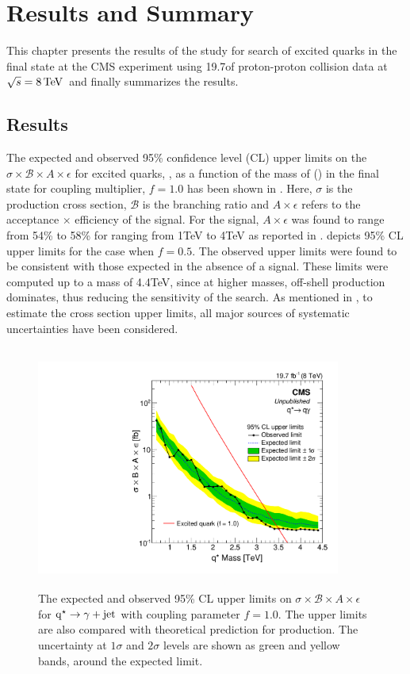 \chapter{Results and Summary}

This chapter presents the results of the study for search of excited quarks in the \gamjet final state at the CMS experiment using 19.7\fbinv of 
proton-proton collision data at $ \sqrt{s}= 8\mathrm{\,TeV} \,$ and finally summarizes the results.

\section{Results}
The expected and observed 95\% confidence level (CL) upper limits on the $\sigma\times\mathcal{B}\times{A}\times\epsilon$ for excited quarks, 
\qstar, as a function of the mass of \qstar (\mqstar) in the \gamjet final state for coupling multiplier, $f = 1.0$ has been shown in 
\fig{\ref{fig:qstarLimitfull}}. Here, $\sigma$ is the production cross section, $\mathcal{B}$ is the branching ratio and $A\times\epsilon$ refers 
to the acceptance $\times$ efficiency of the \qstar signal. For the \qstar signal, $A\times\epsilon$ was found to range from 54\% to 58\% for 
\mqstar ranging from 1\unit{TeV} to 4\unit{TeV} as reported in \tab{\ref{Table:SigEff}}. \Fig{\ref{fig:qstarLimithalf}} depicts 95\% CL upper 
limits for the case when $f = 0.5$. The observed upper limits were found to be consistent with those expected in the absence of a signal. These 
limits were computed up to a \qstar mass of 4.4\unit{TeV}, since at higher masses, off-shell production dominates, thus reducing the sensitivity of 
the search. As mentioned in \sectn{\ref{Se:SysUnc}}, to estimate the cross section upper limits, all major sources of systematic uncertainties have 
been considered. 
\begin{figure}[h!]
\centering
\includegraphics[width=10cm,height=8cm]{ch6/plots/ExcitedQuarksToGJ_f1p0_ObseExp_xsAccEff_Limits_fb.pdf}
 \caption{ The expected and observed 95\% CL upper limits on $\sigma\times\mathcal{B}\times{A}\times\epsilon$ for $\mathrm{q^\star}\to\gamma+\mathrm{jet}$ with coupling
           parameter $f=1.0$. The upper limits are also compared with theoretical prediction for \qstar production. The uncertainty at $1\sigma$ 
           and $2\sigma$ levels are shown as green and yellow bands, around the expected limit.}
\label{fig:qstarLimitfull}
\end{figure}
